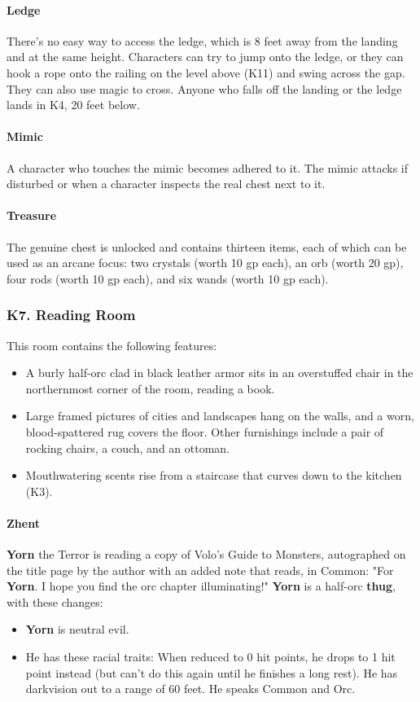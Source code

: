 \documentclass[10pt,a4paper,twoside,twocolumn,openany,nodeprecatedcode]{dndbook}
\begin{document}
\paragraph{Ledge}
There's no easy way to access the ledge, which is 8 feet away from the landing and at the same height. Characters can try to jump onto the ledge, or they can hook a rope onto the railing on the level above (K11) and swing across the gap. They can also use magic to cross. Anyone who falls off the landing or the ledge lands in K4, 20 feet below.
\paragraph{Mimic}
A character who touches the mimic becomes adhered to it. The mimic attacks if disturbed or when a character inspects the real chest next to it.
\paragraph{Treasure}
The genuine chest is unlocked and contains thirteen items, each of which can be used as an arcane focus: two crystals (worth 10 gp each), an orb (worth 20 gp), four rods (worth 10 gp each), and six wands (worth 10 gp each).
\subsubsection{K7. Reading Room}
This room contains the following features:
\begin{itemize}

\item A burly half-orc clad in black leather armor sits in an overstuffed chair in the northernmost corner of the room, reading a book.
\item Large framed pictures of cities and landscapes hang on the walls, and a worn, blood-spattered rug covers the floor. Other furnishings include a pair of rocking chairs, a couch, and an ottoman.
\item Mouthwatering scents rise from a staircase that curves down to the kitchen (K3).
\end{itemize}


\paragraph{Zhent}
\textbf{Yorn} the Terror is reading a copy of Volo's Guide to Monsters, autographed on the title page by the author with an added note that reads, in Common: "For \textbf{Yorn}. I hope you find the orc chapter illuminating!"
\textbf{Yorn} is a half-orc \textbf{thug}, with these changes:
\begin{itemize}

\item \textbf{Yorn} is neutral evil.
\item He has these racial traits: When reduced to 0 hit points, he drops to 1 hit point instead (but can't do this again until he finishes a long rest). He has darkvision out to a range of 60 feet. He speaks Common and Orc.
\end{itemize}
\end{document}
